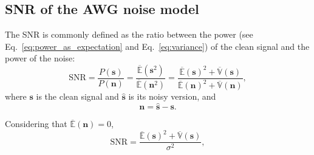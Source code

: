 \begin{comment}
If $\mathbf{s}=\mathbf{0}$ (a constant signal
with zeros), Equations \ref{eq:E_AWG} and \ref{eq:V_AWG}
reduce to
\begin{equation}
  \mathbb{E}(\mathbf{\hat{\mathbf{s}}}) = 0,
\end{equation}
and
\begin{equation}
  \mathbb{V}(\hat{\mathbf{s}}) = \sigma^2,
\end{equation}
respectively, and if $\mathbf{s}=\mathbf{1}$ (a constant signal with
ones)
\begin{equation}
  \mathbb{E}(\hat{\mathbf{s}}) = \mathbb{E}(\mathbf{1}) = 1,
\end{equation}
and
\begin{equation}
  \mathbb{V}(\hat{\mathbf{s}}) = \sigma^2.
\end{equation}
\end{comment}

\subsection{SNR of the AWG noise model}

The \gls{SNR} is commonly defined as the ratio between the power (see
Eq.~\ref{eq:power_as_expectation} and Eq.~\ref{eq:variance}) of the
clean signal and the power of the noise:
\begin{equation}
  \text{SNR} = \frac{P(\mathbf{s})}{P(\mathbf{n})} = \frac{\overline{\mathbb{E}}(\mathbf{s}^2)}{\overline{\mathbb{E}}(\mathbf{n}^2)} = \frac{\overline{\mathbb{E}}(\mathbf{s})^2+\overline{\mathbb{V}}(\mathbf{s})}{\overline{\mathbb{E}}(\mathbf{n})^2+\overline{\mathbb{V}}(\mathbf{n})},
  \label{eq:SNR}
\end{equation}
where $\mathbf{s}$ is the clean signal and $\hat{\mathbf{s}}$ is its
noisy version, and
\begin{equation}
  \mathbf{n} = \hat{\mathbf{s}} - \mathbf{s}.
\end{equation}

Considering that $\overline{\mathbb{E}}(\mathbf{n}) = 0$,
\begin{equation}
  \text{SNR} = \frac{\overline{\mathbb{E}}(\mathbf{s})^2 + \overline{\mathbb{V}}(\mathbf{s})}{\sigma^2},
\end{equation}

